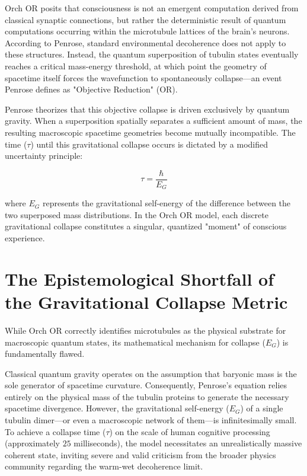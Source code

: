 \documentclass[12pt,openany]{book}
\begin{document}
Orch OR posits that consciousness is not an emergent computation derived from classical synaptic connections, but rather the deterministic result of quantum computations occurring within the microtubule lattices of the brain's neurons. According to Penrose, standard environmental decoherence does not apply to these structures. Instead, the quantum superposition of tubulin states eventually reaches a critical mass-energy threshold, at which point the geometry of spacetime itself forces the wavefunction to spontaneously collapse---an event Penrose defines as "Objective Reduction" (OR).

Penrose theorizes that this objective collapse is driven exclusively by quantum gravity. When a superposition spatially separates a sufficient amount of mass, the resulting macroscopic spacetime geometries become mutually incompatible. The time ($\tau$) until this gravitational collapse occurs is dictated by a modified uncertainty principle:

\begin{equation}
\tau = \frac{\hbar}{E_G}
\end{equation}

where $E_G$ represents the gravitational self-energy of the difference between the two superposed mass distributions. In the Orch OR model, each discrete gravitational collapse constitutes a singular, quantized "moment" of conscious experience.

\section{The Epistemological Shortfall of the Gravitational Collapse Metric}
While Orch OR correctly identifies microtubules as the physical substrate for macroscopic quantum states, its mathematical mechanism for collapse ($E_G$) is fundamentally flawed. 

Classical quantum gravity operates on the assumption that baryonic mass is the sole generator of spacetime curvature. Consequently, Penrose's equation relies entirely on the physical mass of the tubulin proteins to generate the necessary spacetime divergence. However, the gravitational self-energy ($E_G$) of a single tubulin dimer---or even a macroscopic network of them---is infinitesimally small. To achieve a collapse time ($\tau$) on the scale of human cognitive processing (approximately $25$ milliseconds), the model necessitates an unrealistically massive coherent state, inviting severe and valid criticism from the broader physics community regarding the warm-wet decoherence limit.
\end{document}

